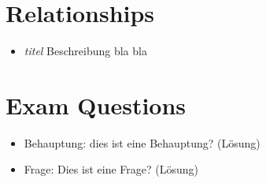 \section{Relationships}
\begin{itemize}
	\item \textit{titel} Beschreibung bla bla
\end{itemize}

\section{Exam Questions}
\begin{itemize}
  \item Behauptung: dies ist eine Behauptung? (Lösung)
    \item Frage: Dies ist eine Frage? (Lösung)
\end{itemize}
